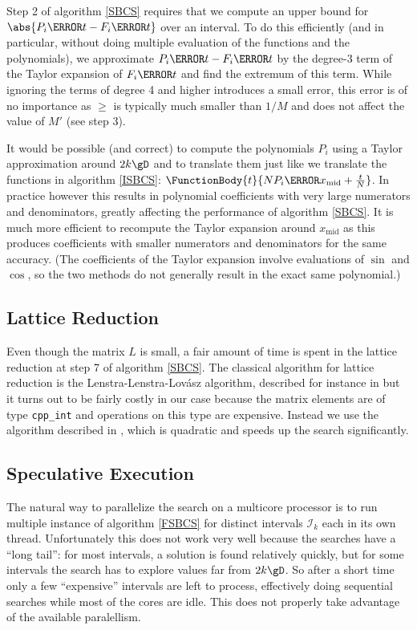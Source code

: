 \documentclass[10pt, a4paper, twoside]{basestyle}
\begin{document}
Step 2 of algorithm \ref{SBCS} requires that we compute an upper bound for $\abs{P_i\of{t} - F_i\of{t}}$ over an interval.  To do this efficiently (and in particular, without doing multiple evaluation of the functions and the polynomials), we approximate $P_i\of{t} - F_i\of{t}$ by the degree-3 term of the Taylor expansion of $F_i\of{t}$ and find the extremum of this term.  While ignoring the terms of degree 4 and higher introduces a small error, this error is of no importance as $\ge$ is typically much smaller than $1 / M$ and does not affect the value of $M'$ (see step 3).

It would be possible (and correct) to compute the polynomials $P_i$ using a Taylor approximation around $2 k \gD$ and to translate them just like we translate the functions in algorithm \ref{ISBCS}: $\FunctionBody{t}{N P_i\of{x_{\text{mid}} + \frac{t}{N}}}$.  In practice however this results in polynomial coefficients with very large numerators and denominators, greatly affecting the performance of algorithm \ref{SBCS}.  It is much more efficient to recompute the Taylor expansion around $x_{\text{mid}}$ as this produces coefficients with smaller numerators and denominators for the same accuracy.  (The coefficients of the Taylor expansion involve evaluations of $\sin$ and $\cos$, so the two methods do not generally result in the exact same polynomial.)

\subsection*{Lattice Reduction}

Even though the matrix $L$ is small, a fair amount of time is spent in the lattice reduction at step 7 of algorithm \ref{SBCS}.  The classical algorithm for lattice reduction is the Lenstra-Lenstra-Lovász algorithm, described for instance in \cite[444]{HoffsteinPipherSilverman2014} but it turns out to be fairly costly in our case because the matrix elements are of type \texttt{cpp\_int} and operations on this type are expensive.  Instead we use the algorithm described in \cite{NguyễnStehlé2009}, which is quadratic and speeds up the search significantly.

\subsection*{Speculative Execution}

The natural way to parallelize the search on a multicore processor is to run multiple instance of algorithm \ref{FSBCS} for distinct intervals $\mathscr{I}_k$ each in its own thread.  Unfortunately this does not work very well because the searches have a ``long tail'': for most intervals, a solution is found relatively quickly, but for some intervals the search has to explore values far from $2 k \gD$.  So after a short time only a few ``expensive'' intervals are left to process, effectively doing sequential searches while most of the cores are idle.  This does not properly take advantage of the available paralellism.
\end{document}
